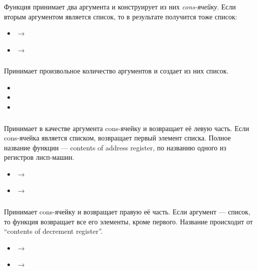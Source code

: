 \documentclass[a4paper, 12pt, titlepage, twoside]{article}
\newenvironment{examples}
               {\begin{itemize}\renewcommand{\labelitemi}{ }}
               {\end{itemize}}
\begin{document}
\subsubsection{}
Функция принимает два аргумента и конструирует из них \textit{cons-ячейку}. Если вторым аргументом  является список, то в результате получится тоже список:
\begin{examples}
  \item {} $\longrightarrow$ 
  \item {} $\longrightarrow$ 
\end{examples}
\subsubsection{}
Принимает произвольное количество аргументов и создает из них список.
\begin{examples}
\item {}
\item {}
\item {}
\end{examples}
\subsubsection{}
Принимает в качестве аргумента cons-ячейку и возвращает её левую часть. Если cons-ячейка является списком, возвращает первый элемент списка. Полное название функции --- contents of address register, по названию одного из регистров лисп-машин.
\begin{examples}
\item {} $\longrightarrow$ 
\item {} $\longrightarrow$ 
\end{examples}
\subsubsection{}
Принимает cons-ячейку и возвращает правую её часть. Если аргумент --- список, то функция возвращает все его элементы, кроме первого. Название происходит от ``contents of decrement register''.
\begin{examples}
\item {} $\longrightarrow$ 
\item {} $\longrightarrow$ 
\end{examples}
\end{document}
